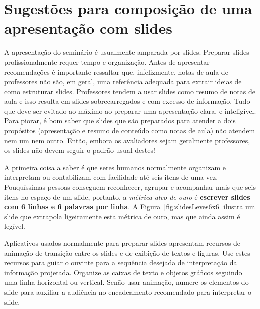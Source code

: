 \section{Sugestões para composição de uma apresentação com slides}

A apresentação do seminário é usualmente amparada por slides. Preparar slides profissionalmente requer tempo e organização. Antes de apresentar recomendações é  importante ressaltar que, infelizmente,  notas de aula de professores não são, em geral,  uma  referência adequada para extrair ideias de como estruturar slides. Professores tendem a usar slides como resumo de notas de aula e isso resulta em slides sobrecarregados e com excesso de informação. Tudo que deve ser evitado ao máximo ao preparar uma apresentação clara, e inteligível. Para piorar, é bom saber que  slides que são preparados para atender  a dois propósitos (apresentação e resumo de conteúdo como notas de aula) não atendem nem um nem outro. Então, embora os avaliadores sejam geralmente professores, os slides não devem seguir o padrão usual  destes! 

A primeira coisa a saber é que seres humanos normalmente organizam e interpretam ou contabilizam com facilidade até seis itens de uma vez. Pouquíssimas pessoas conseguem reconhecer, agrupar e acompanhar mais que seis itens no espaço de um slide, portanto, a \emph{métrica alvo de ouro}  é \textbf{escrever slides com 6 linhas e 6 palavras por linha}. A Figura~\ref{fig:slidesLeves6x6} ilustra um slide que extrapola ligeiramente esta métrica de ouro, mas que ainda assim é legível. 

Aplicativos usados normalmente para preparar slides apresentam recursos de animação de transição entre os slides e de exibição de textos e figuras. Use estes recursos para guiar o ouvinte para a sequência desejada de interpretação da informação projetada.  Organize as caixas de texto e objetos gráficos seguindo uma linha horizontal ou vertical. Senão usar animação, numere os elementos do slide para auxiliar a audiência no encadeamento recomendado para interpretar o slide.

